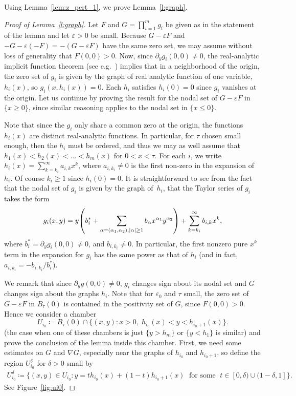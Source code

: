 \documentclass[AHL,Unicode,longabstracts,published]{cedram}
\newcommand{\abs}[1]{\left \lvert #1 \right \rvert}
\renewcommand{\epsilon}{\varepsilon}
\let\originalleft\left
\let\originalright\right
\renewcommand{\left}{\mathopen{}\mathclose\bgroup\originalleft}
\renewcommand{\right}{\aftergroup\egroup\originalright}
\begin{document}
Using Lemma~\ref{lem:z_pert_1}, we prove Lemma~\ref{l:graph}.

\begin{proof}[Proof of Lemma~\ref{l:graph}]
Let $F$ and $G=\prod_{i=1}^m g_i$ be given as in the statement of the lemma and let $\epsilon>0$ be small. Because $G-\epsilon F$ and $-G-\epsilon(-F)=-(G-\epsilon F)$ have the same zero set, we may assume without loss of generality that $F(0,0)>0$. Now, since $\partial_y g_i(0,0) \ne 0$, the real-analytic implicit function theorem (see e.g.~\cite[Theorem~2.3.5]{primer-real-analytic}) implies that in a neighborhood of the origin, the zero set of $g_i$ is given by the graph of real analytic function of one variable, $h_i(x)$, so $g_i(x, h_i(x)) = 0$. Each $h_i$ satisfies $h_i(0) =0$ since $g_i$ vanishes at the origin. Let us continue by proving the result for the nodal set of $G-\epsilon F$ in $\{x \ge 0\}$, since similar reasoning applies to the nodal set in $\{x \le 0\}$.

Note that since the $g_i$ only share a common zero at the origin, the functions $h_i(x)$ are distinct real-analytic functions. In particular, for $\tau$ chosen small enough, then the $h_i$ must be ordered, and thus we may as well assume that $h_1(x) < h_2(x) < \dots < h_m(x)$ for $ 0 < x < \tau$. For each $i$, we write $h_i(x) = \sum_{k = k_i}^\infty a_{i,k} x^k$, where $a_{i,k_i} \ne 0$ is the first non-zero in the expansion of $h_i$. Of course $k_i \ge 1$ since $h_i(0) = 0$. It is straightforward to see from the fact that the nodal set of $g_i$ is given by the graph of~$h_i$, that the Taylor series of $g_i$ takes the form
\begin{equation}\label{eqn:gi_ser}
g_i(x,y) = y \left(b_i^* + \sum_{\alpha = (\alpha_1, \alpha_2), \abs{\alpha} \ge 1} b_\alpha x^{\alpha_1} y^{\alpha_2} \right) + \sum_{k = k_i}^\infty b_{i, k} x^k,
\end{equation}
where $b_i^* = \partial_y g_i(0,0) \ne 0$, and $b_{i, k_i} \ne 0$. In particular, the first nonzero pure $x^k$ term in the expansion for $g_i$ has the same power as that of $h_i$ (and in fact, $a_{i,k_i} = -b_{i, k_i}/b_i^*$).

We remark that since $\partial_y g(0,0) \ne 0$, $g_i$ changes sign about its nodal set and $G$ changes sign about the graphs $h_i$. Note that for $\epsilon_0$ and $\tau$ small, the zero set of $G - \epsilon F$ in $B_\tau(0)$ is contained in the positivity set of $G$, since $F (0,0) > 0$. Hence we consider a chamber
\[
U_{i_0} \coloneqq B_\tau(0) \cap \bigl\{(x,y) : x > 0, \; h_{i_0}(x) < y < h_{i_0+1}(x)\bigr\}.
\]
(the case when one of these chambers is just $\{y > h_m\}$ or $\{ y < h_1\}$ is similar) and prove the conclusion of the lemma inside this chamber. First, we need some estimates on $G$ and $\nabla G$, especially near the graphs of $h_{i_0}$ and $h_{i_0+1}$, so define the region $U_{i_0}^\delta$ for $\delta >0$ small by
\begin{align*}
U_{i_0}^\delta \coloneqq \bigl \{(x,y) \in U_{i_0} : y = t h_{i_0}(x) + (1-t) h_{i_0+1}(x)\; \text{ for some }\; t \in [0, \delta) \cup (1-\delta, 1] \bigl \}.
\end{align*}
See Figure~\ref{fig:ui0}.


\end{proof}
\end{document}

